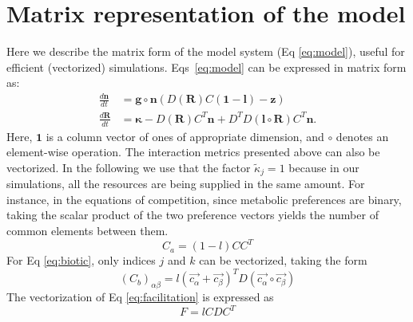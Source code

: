 \documentclass[12pt]{article}
\begin{document}
\section{Matrix representation of the model }\label{matrix_representations}

Here we describe the matrix form of the model system (Eq \ref{eq:model}), useful for efficient (vectorized) simulations. Eqs~\ref{eq:model} can be expressed in matrix form as:
\begin{equation*}
	\begin{aligned}
	\frac{d\boldsymbol{n}}{dt} &= \boldsymbol{g}\circ \boldsymbol{n}\left(D(\boldsymbol{R})C(\boldsymbol{1}-\boldsymbol{l}) - \boldsymbol{z}\right)\\
	\frac{d\boldsymbol{R}}{dt} &= \boldsymbol{\kappa} - D(\boldsymbol{R})C^T\boldsymbol{n} + D^TD(\boldsymbol{l}\circ \boldsymbol{R})C^T\boldsymbol{n}.
	\end{aligned}
\end{equation*}
Here, $\boldsymbol{1}$ is a column vector of ones of appropriate dimension, and $ \circ $ denotes an element-wise operation.
The interaction metrics  presented above can also be vectorized. In the following we use that the factor $\tilde{\kappa}_j = 1$ because in our simulations, all the resources are being supplied in the same amount. For instance, in the equations of competition, since metabolic preferences are binary, taking the scalar product of the two preference vectors yields the number of common elements between them.
\begin{equation*}
    	C_a = (1-l) CC^T
\end{equation*}
For Eq \ref{eq:biotic}, only indices $j$ and $k$ can be vectorized, taking the form
\begin{equation*}
    (C_b)_{\alpha \beta} = l \left(\vec{c_{\alpha}} + \vec{c_{\beta}}\right)^T D \left(\vec{c_{\alpha}}\circ \vec{c_{\beta}}\right)
\end{equation*}
The vectorization of Eq \ref{eq:facilitation} is expressed as
\begin{equation*}
    F = l C D C^T
\end{equation*}
\end{document}
